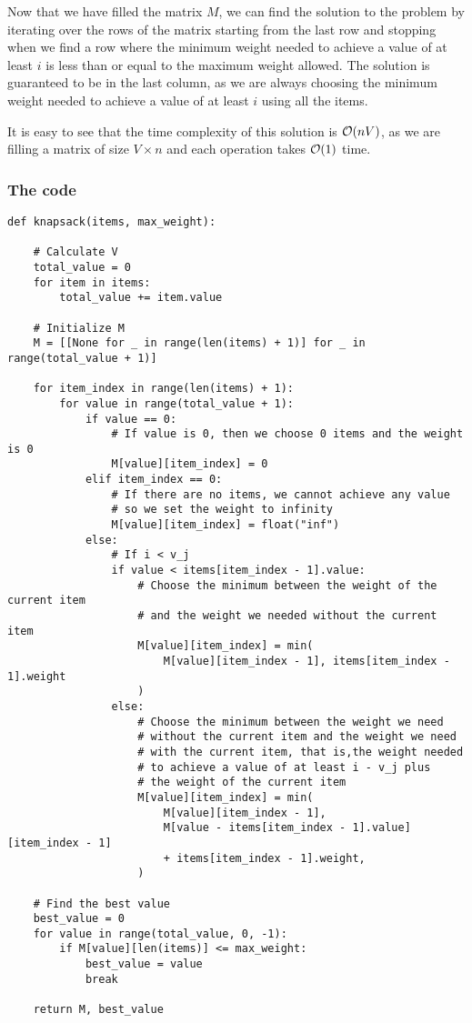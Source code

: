 \documentclass[12pt]{extarticle}
\begin{document}
Now that we have filled the matrix $M$, we can find the solution to the problem by iterating over the rows of the matrix starting from the last row and stopping when we find a row where the minimum weight needed to achieve a value of at least $i$ is less than or equal to the maximum weight allowed.
The solution is guaranteed to be in the last column, as we are always choosing the minimum weight needed to achieve a value of at least $i$ using all the items.

It is easy to see that the time complexity of this solution is $\mathcal{O}(nV)$, as we are filling a matrix of size $V \times n$ and each operation takes $\mathcal{O}(1)$ time.

\clearpage

\subsubsection*{The code}

\begin{verbatim}
def knapsack(items, max_weight):

    # Calculate V
    total_value = 0
    for item in items:
        total_value += item.value

    # Initialize M
    M = [[None for _ in range(len(items) + 1)] for _ in range(total_value + 1)]

    for item_index in range(len(items) + 1):
        for value in range(total_value + 1):
            if value == 0:
                # If value is 0, then we choose 0 items and the weight is 0
                M[value][item_index] = 0
            elif item_index == 0:
                # If there are no items, we cannot achieve any value
                # so we set the weight to infinity
                M[value][item_index] = float("inf")
            else:
                # If i < v_j
                if value < items[item_index - 1].value:
                    # Choose the minimum between the weight of the current item
                    # and the weight we needed without the current item
                    M[value][item_index] = min(
                        M[value][item_index - 1], items[item_index - 1].weight
                    )
                else:
                    # Choose the minimum between the weight we need
                    # without the current item and the weight we need
                    # with the current item, that is,the weight needed
                    # to achieve a value of at least i - v_j plus
                    # the weight of the current item
                    M[value][item_index] = min(
                        M[value][item_index - 1],
                        M[value - items[item_index - 1].value][item_index - 1]
                        + items[item_index - 1].weight,
                    )

    # Find the best value
    best_value = 0
    for value in range(total_value, 0, -1):
        if M[value][len(items)] <= max_weight:
            best_value = value
            break

    return M, best_value
\end{verbatim}
\end{document}
